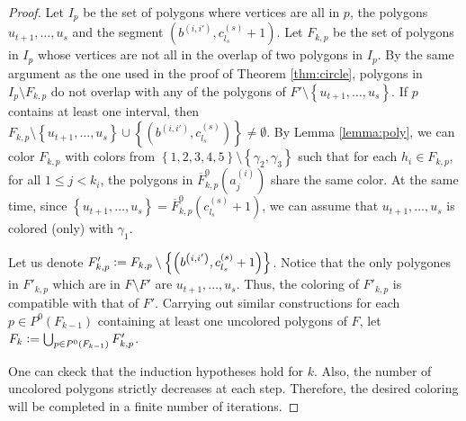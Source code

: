 \documentclass[12pt]{article}
\theoremstyle{definition}
\newcommand{\defeq}{\vcentcolon=}
\begin{document}
\begin{proof}
         Let $I_{p}$ be the set of polygons
         where vertices are all
         in $p$, the polygons
         $u_{t+1}, \ldots, u_{s}$ and 
         the segment $\left(b^{\left(i, i'\right)},
         c_{l_{s}}^{\left(s\right)} + 1\right)$.
         Let $F_{k, p}$ be the set of
         polygons in $I_{p}$ whose 
         vertices are not all in
         the overlap of two polygons
         in $I_{p}$.
         By the same argument as the
         one used in the proof of 
         Theorem \ref{thm:circle},
         polygons in $I_{p} \setminus F_{k, p}$ 
         do not overlap with 
         any of the polygons of
         $F' \setminus \left\{u_{t+1}, \ldots
         , u_{s}\right\}$.
         If $p$ contains at least
         one interval, 
         then 
         $F_{k, p} \setminus 
         \left\{u_{t + 1}, \ldots,
         u_{s}\right\} \cup 
         \left\{ \left(b^{\left(i, i'\right)}, 
         c_{l_{s}}^{\left(s\right)}\right)\right\}
         \neq \emptyset$.
         By Lemma \ref{lemma:poly},
         we can color $F_{k, p}$ with
         colors from 
         $\left\{1, 2, 3, 4, 5\right\} \setminus 
         \left\{\gamma_2, \gamma_3\right\}$
         such that for each $h_{i} \in F_{k, p}$,
         for all
         $1 \leq j < k_{i}$, the polygons in
         $\overline{F}_{k, p}^{0}\left(a_{j}^{\left(i\right)}\right)$ 
         share the same color. At the same time,
         since $\left\{u_{t +1}, \ldots, u_{s}\right\} = 
         \overline{F}_{k, p}^{0}\left(c_{l_{s}}^{\left(s\right)} + 1\right)$,
         we can assume that $u_{t + 1}, \ldots, u_{s}$ 
         is colored (only) with $\gamma_1$.

         Let us denote $F'_{k, p} \defeq
         F_{k, p} \setminus \left\{\left(
         b^{\left(i, i'\right)},
         c_{l_{s}}^{\left(s\right)} + 1\right)\right\}$.
         Notice that the only
         polygones in $F'_{k, p}$ 
         which are in $F \setminus F'$ 
         are $u_{t + 1}, \ldots, u_{s}$.
         Thus, the coloring of
         $F'_{k, p}$ is compatible with that 
         of $F'$. Carrying out similar 
         constructions for each 
         $p \in P^{0}\left(F_{k-1}\right)$ 
         containing at least one uncolored
         polygons of $F$, let 
         $F_{k} \defeq \bigcup_{p \in P^{0}\left(F_{k -1}\right)}
         F'_{k, p}$.

         One can ckeck that the induction
         hypotheses hold for $k$.
         Also, the number of uncolored polygons
         strictly decreases at each step.
         Therefore, the desired coloring will be completed
         in a finite number of iterations.
     \end{proof}    
\end{document}
